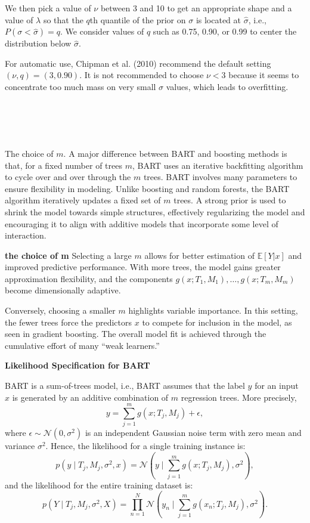 \documentclass[a4paper,11pt]{article}
\begin{document}
We then pick a value of \( \nu \) between 3 and 10 to get an appropriate shape and a value of \( \lambda \) so that the \( q \)th quantile of the prior on \( \sigma \) is located at \( \hat{\sigma} \), i.e., \( P(\sigma < \hat{\sigma}) = q \). We consider values of \( q \) such as 0.75, 0.90, or 0.99 to center the distribution below \( \hat{\sigma} \).

For automatic use, Chipman et al. (2010) recommend the default setting \( (\nu, q) = (3, 0.90) \). It is not recommended to choose \( \nu < 3 \) because it seems to concentrate too much mass on very small \( \sigma \) values, which leads to overfitting.

\\\\\\\\The choice of \(m\). A major difference between BART and boosting methods is that, for a fixed number of trees \(m\), BART uses an iterative backfitting algorithm to cycle over and over through the \(m\) trees.
BART involves many parameters to ensure flexibility in modeling. Unlike boosting and random forests, the BART algorithm iteratively updates a fixed set of \(m\) trees. A strong prior is used to shrink the model towards simple structures, effectively regularizing the model and encouraging it to align with additive models that incorporate some level of interaction.

\textbf{the choice of m} Selecting a large \(m\) allows for better estimation of \(\mathbb{E}[Y|x]\) and improved predictive performance. With more trees, the model gains greater approximation flexibility, and the components \(g(x; T_1, M_1), \dots, g(x; T_m, M_m)\) become dimensionally adaptive. 

Conversely, choosing a smaller \(m\) highlights variable importance. In this setting, the fewer trees force the predictors \(x\) to compete for inclusion in the model, as seen in gradient boosting. The overall model fit is achieved through the cumulative effort of many “weak learners.”

\textbf{Likelihood Specification for BART}

BART is a sum-of-trees model, i.e., BART assumes that the label \( y \) for an input \( x \) is generated by an additive combination of \( m \) regression trees. More precisely,
\[
y = \sum_{j=1}^{m} g(x; T_j, M_j) + \epsilon,
\]
where \( \epsilon \sim \mathcal{N}(0, \sigma^2) \) is an independent Gaussian noise term with zero mean and variance \( \sigma^2 \). Hence, the likelihood for a single training instance is:
\[
p(y \mid T_j, M_j, \sigma^2, x) = \mathcal{N}\left(y \mid \sum_{j=1}^{m} g(x; T_j, M_j), \sigma^2\right),
\]
and the likelihood for the entire training dataset is:
\[
p(Y \mid T_j, M_j, \sigma^2, X) = \prod_{n=1}^{N} \mathcal{N}\left(y_n \mid \sum_{j=1}^{m} g(x_n; T_j, M_j), \sigma^2\right).
\]
\end{document}
